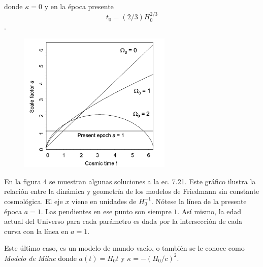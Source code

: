 \documentclass[11pt]{article}
\begin{document}
{\begin{itemize}
    donde $\kappa = 0$ y en la época presente $$t_0 = (2/3) H_0^{2/3}$$.
    
    \end{itemize}

 
    
    
    \begin{figure}               \includegraphics[width=0.65\textwidth]{grafica_scale_factor_timepp219Malcolm.png}
        \caption{}%
    \end{figure}
    
    
       En la figura 4 se muestran algunas soluciones a la ec. 7.21. Este gráfico ilustra la relación entre la dinámica y geometría de los modelos de Friedmann sin constante cosmológica. El eje $x$ viene en unidades de $H_0^{-1}$. Nótese la línea de la presente época $a=1$.  Las pendientes en ese punto son siempre $1$. Así mismo, la edad actual del Universo para cada parámetro es dada por la intersección de cada curva con la línea en $a=1$. 
    

    
    Este último caso, es un modelo de mundo vacío, o también se le conoce como {\textit{Modelo de Milne}} donde $a(t) = H_0 t$ y $\kappa = - (H_0/c)^2$. 
    
    
    \newpage
    
}
\end{document}
